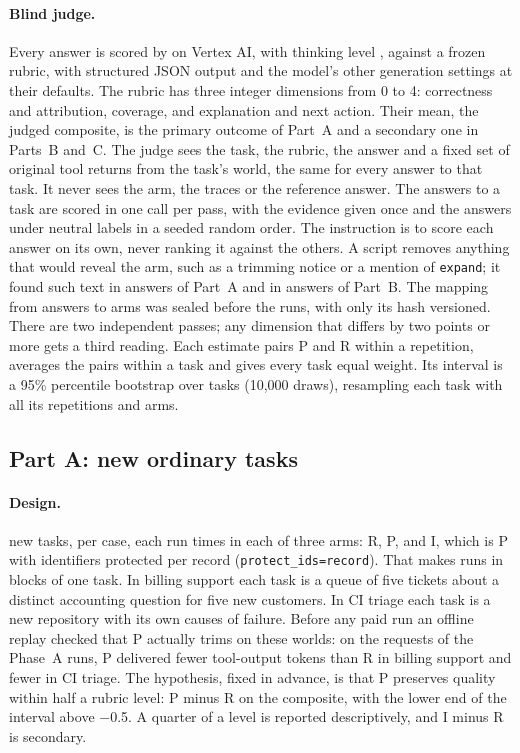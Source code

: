 \paragraph{Blind judge.} Every answer is scored by \texttt{\SfourJudge} on Vertex AI, with thinking level
\texttt{\SfourJudgeThinking}, against a frozen rubric, with structured JSON output and the model's other
generation settings at their defaults. The rubric has three integer dimensions from 0 to 4: correctness and
attribution, coverage, and explanation and next action. Their mean, the judged composite, is the primary outcome of
Part~A and a secondary one in Parts~B and~C. The
judge sees the task, the rubric, the answer and a fixed set of original tool returns from the task's world, the
same for every answer to that task. It never sees the arm, the traces or the reference answer. The answers to a
task are scored in one call per pass, with the evidence given once and the answers under neutral labels in a
seeded random order. The instruction is to score each answer on its own, never ranking it against the others. A
script removes anything that would reveal the arm, such as a trimming notice or a mention of \texttt{expand}; it
found such text in \SfourACues{} answers of Part~A and in \SfourBCues{} answers of Part~B. The mapping from answers to arms
was sealed before the runs, with only its hash versioned. There are two independent passes; any dimension that
differs by two points or more gets a third reading. Each estimate pairs P and R within a repetition, averages the
pairs within a task and gives every task equal weight. Its interval is a 95\% percentile bootstrap over tasks
(10{,}000 draws), resampling each task with all its repetitions and arms.

\subsection{Part A: new ordinary tasks}
\label{sec:s4a}

\paragraph{Design.} \SfourATasks{} new tasks, \SfourATasksPerCase{} per case, each run \SfourAReps{} times in each
of three arms: R, P, and I, which is P with identifiers protected per record (\texttt{protect\_ids=record}).
That makes \SfourARuns{} runs in blocks of one task. In billing support each task is a queue of five tickets about
a distinct accounting question for five new customers. In CI triage each task is a new repository with its own
causes of failure. Before any paid run an offline replay checked that P actually trims on these worlds: on the
requests of the Phase~A runs, P delivered \SfourAReplayPiv{} fewer tool-output tokens than R in billing support and
\SfourAReplayPv{} fewer in CI triage. The hypothesis, fixed in advance, is that P preserves quality within half a
rubric level: P minus R on the composite, with the lower end of the interval above $-$0.5. A quarter of a level
is reported descriptively, and I minus R is secondary.

